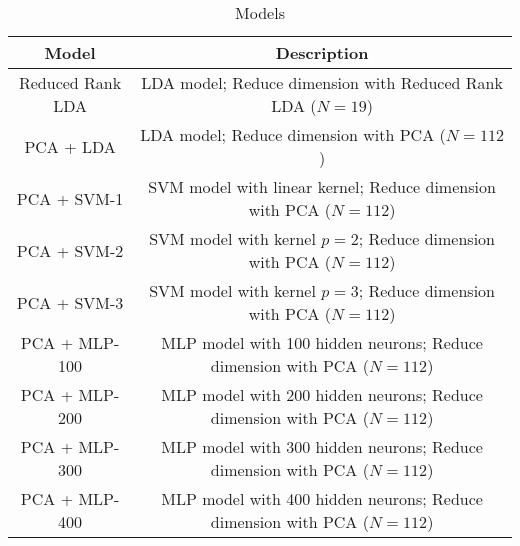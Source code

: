 \begin{table}
    \centering
    \caption{Models}
    \label{tab:models}
    \begin{tabular}{c|c}
        \hline\hline
        Model & Description \\\hline\hline
        Reduced Rank LDA & LDA model; Reduce dimension with Reduced Rank LDA ($N=19$) \\
        PCA + LDA & LDA model; Reduce dimension with PCA ($N=112$) \\
        PCA + SVM-1 & SVM model with linear kernel; Reduce dimension with PCA ($N=112$) \\
        PCA + SVM-2 & SVM model with kernel $p=2$; Reduce dimension with PCA ($N=112$) \\
        PCA + SVM-3 & SVM model with kernel $p=3$; Reduce dimension with PCA ($N=112$) \\
        PCA + MLP-100 & MLP model with 100 hidden neurons; Reduce dimension with PCA ($N=112$) \\
        PCA + MLP-200 & MLP model with 200 hidden neurons; Reduce dimension with PCA ($N=112$) \\
        PCA + MLP-300 & MLP model with 300 hidden neurons; Reduce dimension with PCA ($N=112$) \\
        PCA + MLP-400 & MLP model with 400 hidden neurons; Reduce dimension with PCA ($N=112$) \\
        \hline
    \end{tabular}
\end{table}